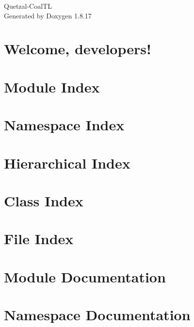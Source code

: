 \let\mypdfximage\pdfximage\def\pdfximage{\immediate\mypdfximage}\documentclass[twoside]{book}
\newcommand{\+}{\discretionary{\mbox{\scriptsize$\hookleftarrow$}}{}{}}
\newcommand{\clearemptydoublepage}{%
  \newpage{\pagestyle{empty}\cleardoublepage}%
}
\begin{document}
\hypersetup{pageanchor=false,
             bookmarksnumbered=true,
             pdfencoding=unicode
            }
\begin{titlepage}
\vspace*{7cm}
\begin{center}%
{\Large Quetzal-\/\+Coal\+TL }\\
\vspace*{1cm}
{\large Generated by Doxygen 1.8.17}\\
\end{center}
\end{titlepage}
\clearemptydoublepage
{}
\tableofcontents
\clearemptydoublepage
{}
\hypersetup{pageanchor=true}

\chapter{Welcome, developers!}
\label{index}\hypertarget{index}{}
\chapter{Module Index}

\chapter{Namespace Index}

\chapter{Hierarchical Index}

\chapter{Class Index}

\chapter{File Index}

\chapter{Module Documentation}











\chapter{Namespace Documentation}




\end{document}
